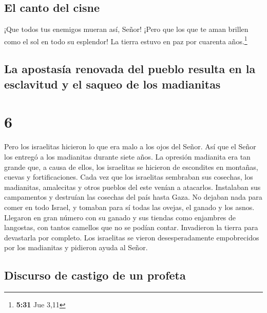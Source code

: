 \hypertarget{el-canto-del-cisne}{%
\subsection{El canto del cisne}\label{el-canto-del-cisne}}

 ¡Que todos tus enemigos mueran así, Señor! ¡Pero que los
que te aman brillen como el sol en todo su esplendor! La tierra estuvo
en paz por cuarenta años.\footnote{\textbf{5:31} Jue 3,11}

\hypertarget{la-apostasuxeda-renovada-del-pueblo-resulta-en-la-esclavitud-y-el-saqueo-de-los-madianitas}{%
\subsection{La apostasía renovada del pueblo resulta en la esclavitud y
el saqueo de los
madianitas}\label{la-apostasuxeda-renovada-del-pueblo-resulta-en-la-esclavitud-y-el-saqueo-de-los-madianitas}}

\hypertarget{section-5}{%
\section{6}\label{section-5}}

 Pero los israelitas hicieron lo que era malo a los ojos
del Señor. Así que el Señor los entregó a los madianitas durante siete
años.  La opresión madianita era tan grande que, a causa
de ellos, los israelitas se hicieron de escondites en montañas, cuevas y
fortificaciones.  Cada vez que los israelitas sembraban
sus cosechas, los madianitas, amalecitas y otros pueblos del este venían
a atacarlos.  Instalaban sus campamentos y destruían las
cosechas del país hasta Gaza. No dejaban nada para comer en todo Israel,
y tomaban para sí todas las ovejas, el ganado y los asnos.
 Llegaron en gran número con su ganado y sus tiendas como
enjambres de langostas, con tantos camellos que no se podían contar.
Invadieron la tierra para devastarla por completo.  Los
israelitas se vieron desesperadamente empobrecidos por los madianitas y
pidieron ayuda al Señor.

\hypertarget{discurso-de-castigo-de-un-profeta}{%
\subsection{Discurso de castigo de un
profeta}\label{discurso-de-castigo-de-un-profeta}}

